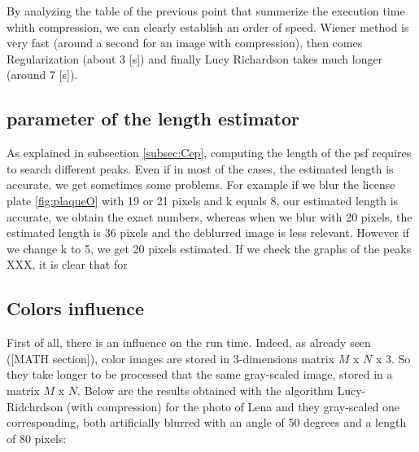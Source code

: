 By analyzing the table of the previous point that summerize the execution time whith compression, we can clearly establish an order of speed. Wiener method is very fast (around a second for an image with compression), then comes Regularization (about 3 [s]) and finally Lucy Richardson takes much longer (around 7 [s]).



\subsection{parameter of the length estimator}

As explained in subsection \ref{subsec:Cep}, computing the length of the psf requires to search different peaks. Even if in most of the cases, the estimated length is accurate, we get sometimes some problems. For example if we blur the license plate \ref{fig:plaqueO} with 19 or 21 pixels and k equals 8, our estimated length is accurate, we obtain the exact numbers, whereas when we blur with 20 pixels, the estimated length is 36 pixels and the deblurred image is less relevant. However if we change k to 5, we get 20 pixels estimated. If we check the graphs of the peaks XXX, it is clear that for 


\subsection{Colors influence}

First of all, there is an influence on the run time. Indeed, as already seen ([MATH section]), color images are stored in 3-dimensions matrix $M$ x $N$ x $3$. So they take longer to be processed that the same gray-scaled image, stored in a matrix $M$ x $N$.
Below are the results obtained with the algorithm Lucy-Ridchrdson (with compression) for the photo of Lena and they gray-scaled one corresponding, both artificially blurred with an angle of 50 degrees and a length of 80 pixels:

